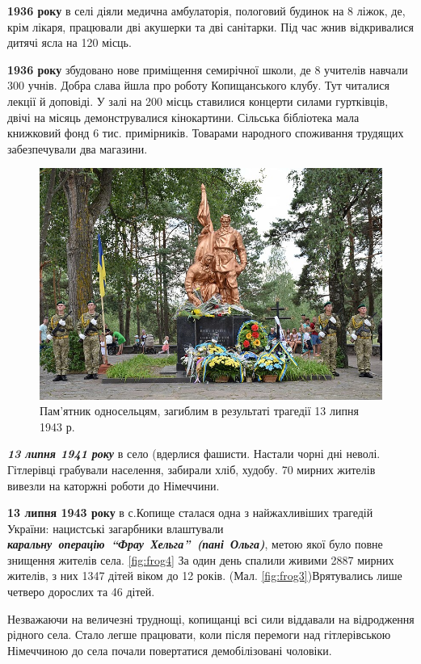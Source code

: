 \textbf{1936 року} в селі діяли медична амбулаторія, пологовий будинок на 8 ліжок, де, крім лікаря, працювали дві акушерки та дві санітарки. Під час жнив відкривалися дитячі ясла на 120 місць.

\textbf{1936 року} збудовано нове приміщення семирічної школи, де 8 учителів навчали 300 учнів. Добра слава йшла про роботу Копищанського клубу. Тут читалися лекції й доповіді. У залі на 200 місць ставилися концерти силами гуртківців, двічі на місяць демонструвалися кінокартини. Сільська бібліотека мала книжковий фонд 6 тис. примірників. Товарами народного споживання трудящих забезпечували два магазини.
\begin{figure}[h]
	
	\centering
	
	\includegraphics[width=0.8\linewidth]{0.jpg}
	
	\caption{\label{fig:frog3}Пам'ятник односельцям, загиблим в результаті трагедії 13 липня 1943 р.}
	
	\label{fig:mpr}
	
\end{figure}

\textbf{\textsl{13 липня 1941 року}} в село (вдерлися фашисти. Настали чорні дні неволі. Гітлерівці грабували населення, забирали хліб, худобу. 70 мирних жителів вивезли на каторжні роботи до Німеччини.

\textbf{13 липня 1943 року} в с.Копище сталася одна з найжахливіших трагедій України: нацистські загарбники влаштували \mbox{\textbf{\textsl{каральну операцію “Фрау Хельга” (пані Ольга)}}}, метою якої було повне знищення жителів села. \ref{fig:frog4} За один день спалили живими 2887 мирних жителів, з них 1347 дітей віком до 12 років. (Мал. \ref{fig:frog3})Врятувались лише четверо дорослих та 46 дітей.

Незважаючи на величезні труднощі, копищанці всі сили віддавали на відродження рідного села. Стало легше працювати, коли після перемоги над гітлерівською Німеччиною до села почали повертатися демобілізовані чоловіки.

